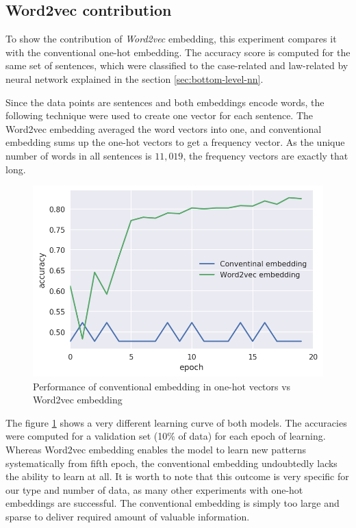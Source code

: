 \documentclass[
  digital, %
  table,   %
  lof,     %
  lot,     %
]{fithesis3}
\begin{document}
\subsection{Word2vec contribution}
To show the contribution of \textit{Word2vec} embedding, this experiment compares it with the conventional one-hot embedding.
The accuracy score is computed for the same set of sentences, which were classified to the case-related and law-related by neural network explained in the section \ref{sec:bottom-level-nn}.

Since the data points are sentences and both embeddings encode words, the following technique were used to create one vector for each sentence.
The Word2vec embedding averaged the word vectors into one, and conventional embedding sums up the one-hot vectors to get a frequency vector.
As the unique number of words in all sentences is $11,019$, the frequency vectors are exactly that long.

\begin{figure}[h]
\caption{Performance of conventional embedding in one-hot vectors vs Word2vec embedding}
\label{fig:eval_word2vec_contribution}
\includegraphics[width=\textwidth]{img/eval_word2vec_contribution}
\end{figure}

The figure \ref{fig:eval_word2vec_contribution} shows a very different learning curve of both models.
The accuracies were computed for a validation set (10\% of data) for each epoch of learning.
Whereas Word2vec embedding enables the model to learn new patterns systematically from fifth epoch, the conventional embedding undoubtedly lacks the ability to learn at all.
It is worth to note that this outcome is very specific for our type and number of data, as many other experiments with one-hot embeddings are successful.  
The conventional embedding is simply too large and sparse to deliver required amount of valuable information.
\end{document}

